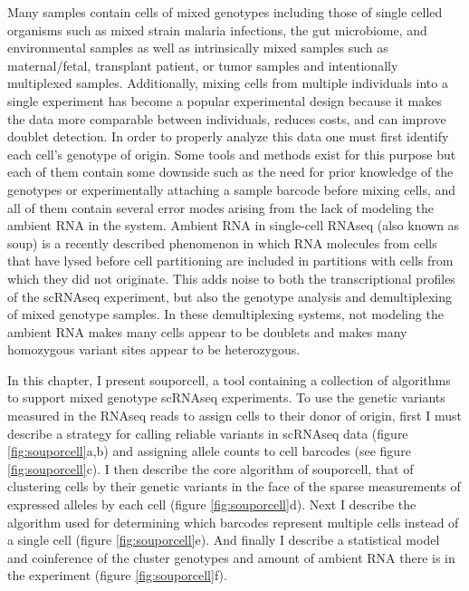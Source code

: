 \par{
Many samples contain cells of mixed genotypes including those of single celled organisms such as mixed strain malaria infections, 
the gut microbiome, and environmental samples as well 
as intrinsically mixed samples such as maternal/fetal, transplant patient, or tumor samples and intentionally multiplexed samples.
Additionally, mixing cells from multiple individuals into a single experiment has become a popular experimental design because it makes the data more comparable between individuals, reduces costs, and can improve doublet detection. 
 In order to properly 
analyze this data one must first identify each cell's genotype of origin. Some tools and methods exist for this purpose\cite{demuxlet}\cite{cellhashing}\cite{scsplit} 
but each of them contain some downside such as the need for prior knowledge of the genotypes or experimentally attaching a sample barcode before mixing cells, and all of them 
contain several error modes arising from the lack of modeling the ambient RNA in the system. Ambient RNA in single-cell RNAseq (also known as soup) is a recently described 
phenomenon in which RNA molecules from cells that have lysed before cell partitioning are included in partitions with cells from which they did not originate\cite{soupx}. This adds noise to both the transcriptional profiles of the scRNAseq experiment, but also the genotype analysis and demultiplexing of mixed genotype samples. 
In these demultiplexing systems, not modeling the ambient RNA makes many cells appear to be doublets and makes many homozygous variant sites appear to be 
heterozygous. 
} 

\par{
In this chapter, I present souporcell, a tool containing a collection of algorithms to support mixed genotype scRNAseq experiments\cite{souporcell}. 
To use the genetic variants measured in the RNAseq reads to assign cells to their donor of origin, first I must describe a strategy for calling reliable variants in scRNAseq data (figure \ref{fig:souporcell}a,b) and assigning allele counts to cell barcodes (see figure \ref{fig:souporcell}c). I then describe the core algorithm of souporcell, that of clustering cells by their genetic variants in the face of the sparse measurements of expressed alleles by each cell (figure \ref{fig:souporcell}d). Next I describe the algorithm used for determining which barcodes represent multiple cells instead of a single cell (figure \ref{fig:souporcell}e). And finally I describe a statistical model and coinference of the cluster genotypes and amount of ambient RNA there is in the experiment (figure \ref{fig:souporcell}f). 
}


